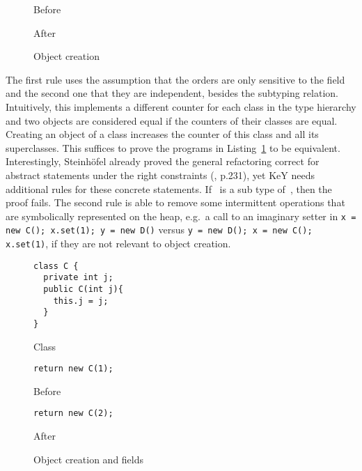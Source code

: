\begin{figure}[tbp]
  \captionsetup{type=lstlisting}
  \centering
  \begin{sublstlisting}{.2\linewidth}
    
    \caption{Before}
  \end{sublstlisting}\hspace{1cm}
  \begin{sublstlisting}{.2\linewidth}
    
    \caption{After}
  \end{sublstlisting}
  \caption{Object creation}
  \label{lst:ObjectCreation-refinity}
\end{figure}

The first rule uses the assumption that the orders are only sensitive to the  field and the second one that they are independent, besides the subtyping relation.
Intuitively, this implements a different counter for each class in the type hierarchy and two objects are considered equal if the counters of their classes are equal.
Creating an object of a class increases the counter of this class and all its superclasses.
This suffices to prove the programs in Listing~\ref{lst:ObjectCreation-refinity} to be equivalent.
Interestingly, Steinhöfel already proved the general  refactoring correct for abstract statements under the right constraints (\cite{steinhoefel-20}, p.231), yet KeY needs additional rules for these concrete statements.
If~ is a sub type of~, then the proof fails.
The second rule is able to remove some intermittent operations that are symbolically represented on the heap, e.g.\ a call to an imaginary setter in \lstinline{x = new C(); x.set(1); y = new D()} versus \lstinline{y = new D(); x = new C(); x.set(1)}, if they are not relevant to object creation.

\begin{figure}[tbp]
\captionsetup{type=lstlisting}
\centering
\begin{sublstlisting}[b]{.3\linewidth}
\begin{lstlisting}[style=refinity]
class C {
  private int j;
  public C(int j){
    this.j = j;
  }
}
\end{lstlisting}
\caption{Class}
\end{sublstlisting}\hspace{3mm}
\begin{sublstlisting}[b]{.3\linewidth}
\begin{lstlisting}[style=refinity]
return new C(1);
\end{lstlisting}
\caption{Before}
\end{sublstlisting}\hspace{3mm}
\begin{sublstlisting}[b]{.3\linewidth}
\begin{lstlisting}[style=refinity]
return new C(2);
\end{lstlisting}
\caption{After}
\end{sublstlisting}
\caption{Object creation and fields}
\label{lst:ObjectCreation-refinity-2}
\end{figure}

